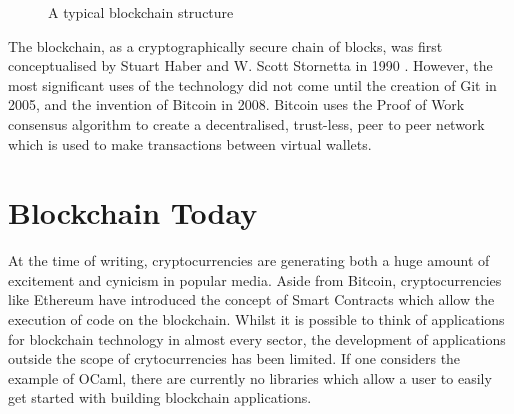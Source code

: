 \documentclass[12pt,a4paper,twoside,openright]{report}
\begin{document}
	\begin{figure}
		\begin{center}
			\end{center}
		\caption{A typical blockchain structure}
		\label{fig:mainblockchain}
	\end{figure}
	The blockchain, as a cryptographically secure chain of blocks, was first conceptualised by Stuart Haber and W. Scott Stornetta in 1990 \parencite{10.1007/3-540-38424-3_32}.
	However, the most significant uses of the technology did not come until the creation of Git \parencite{Git} in 2005, and the invention of Bitcoin \parencite{Bitcoin} in 2008.
	Bitcoin uses the Proof of Work consensus algorithm to create a decentralised, trust-less, peer to peer network which is used to make transactions between virtual wallets.

	\section{Blockchain Today}
	At the time of writing, cryptocurrencies are generating both a huge amount of excitement and cynicism in popular media. 
	Aside from Bitcoin, cryptocurrencies like Ethereum \parencite{Ethereum} have introduced the concept of Smart Contracts which allow the execution of code on the blockchain.
	Whilst it is possible to think of applications for blockchain technology in almost every sector, the development of applications outside the scope of crytocurrencies has been limited. 
	If one considers the example of OCaml, there are currently no libraries which allow a user to easily get started with building blockchain applications. \\
\end{document}
